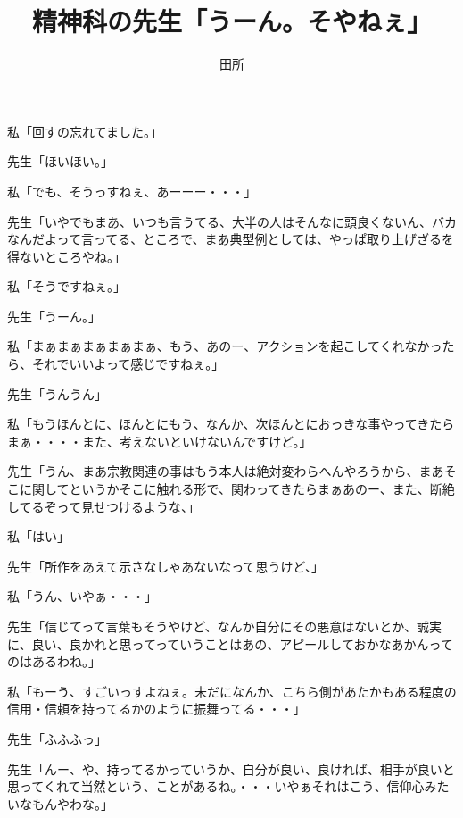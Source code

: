 \documentclass[b5j,twoside,twocolumn]{utarticle}
\title{精神科の先生「うーん。そやねぇ」}
\author{田所}
\date{\vspace{-5mm}}
\makeatletter
\def\yakuchu{%
\@ifnextchar[\@xfootnote %
{\stepcounter{yakuchu}%
\protected@xdef\@thefnmark{\theyakuchu}%
\@footnotemark\@footnotetext}}
\makeatother
\begin{document}
\maketitle

\setlength{\footskip}{-2mm}
\chead[]{}
\lfoot[]{\thepage{}}
\cfoot[]{}
\rfoot[\thepage{}]{}

\let\yakuchu=\endnote
\renewcommand{\footnoterule}{\noindent\rule{100mm}{0.3mm}\vskip2mm}
\thispagestyle{fancy}
\begin{description}
\setlength{\leftskip}{-3.0zw}
\setlength{\itemsep}{-0.3zw} %
\item 私「回すの忘れてました。」
\item 先生「ほいほい。」
\item 私「でも、そうっすねぇ、あーーー・・・」
\item 先生「いやでもまあ、いつも言うてる、大半の人はそんなに頭良くないん、バカなんだよって言ってる、ところで、まあ典型例としては、やっぱ取り上げざるを得ないところやね。」
\item 私「そうですねぇ。」
\item 先生「うーん。」
\item 私「まぁまぁまぁまぁまぁ、もう、あのー、アクションを起こしてくれなかったら、それでいいよって感じですねぇ。」
\item 先生「うんうん」
\item 私「もうほんとに、ほんとにもう、なんか、次ほんとにおっきな事やってきたらまぁ・・・・また、考えないといけないんですけど。」
\item 先生「うん、まあ宗教関連の事はもう本人は絶対変わらへんやろうから、まあそこに関してというかそこに触れる形で、関わってきたらまぁあのー、また、断絶してるぞって見せつけるような、」
\item 私「はい」
\item 先生「所作をあえて示さなしゃあないなって思うけど、」
\item 私「うん、いやぁ・・・」
\item 先生「信じてって言葉もそうやけど、なんか自分にその悪意はないとか、誠実に、良い、良かれと思ってっていうことはあの、アピールしておかなあかんってのはあるわね。」
\item 私「もーう、すごいっすよねぇ。未だになんか、こちら側があたかもある程度の信用・信頼を持ってるかのように振舞ってる・・・」
\item 先生「ふふふっ」
\item 先生「んー、や、持ってるかっていうか、自分が良い、良ければ、相手が良いと思ってくれて当然という、ことがあるね。・・・いやぁそれはこう、信仰心みたいなもんやわな。」

\end{description}
\end{document}
